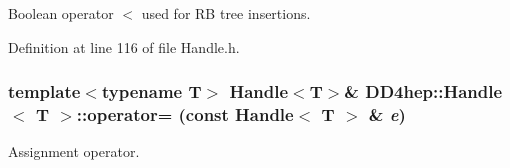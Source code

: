 Boolean operator $<$ used for RB tree insertions. 

Definition at line 116 of file Handle.h.\hypertarget{class_d_d4hep_1_1_handle_a9bbf8f498df42e81ad26fb00233505a6}{
\subsubsection[{operator=}]{\setlength{\rightskip}{0pt plus 5cm}template$<$typename T$>$ {\bf Handle}$<${\bf T}$>$\& {\bf DD4hep::Handle}$<$ {\bf T} $>$::operator= (const {\bf Handle}$<$ {\bf T} $>$ \& {\em e})}}
\label{class_d_d4hep_1_1_handle_a9bbf8f498df42e81ad26fb00233505a6}


Assignment operator. 

